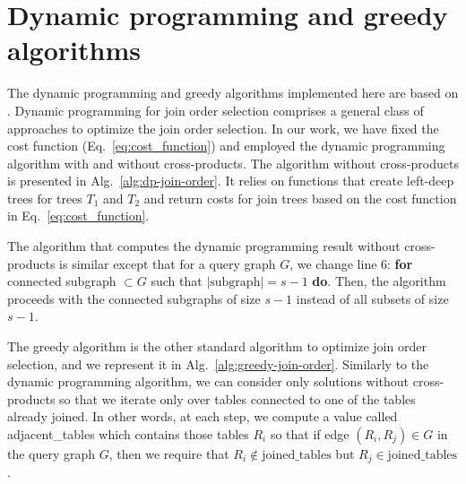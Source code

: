 \section{Dynamic programming and greedy algorithms}

The dynamic programming and greedy algorithms implemented here are based on \cite{Neumann_course}. Dynamic programming for join order selection comprises a general class of approaches to optimize the join order selection. In our work, we have fixed the cost function (Eq.~\eqref{eq:cost_function}) and employed the dynamic programming algorithm with and without cross-products. The algorithm without cross-products is presented in Alg.~\ref{alg:dp-join-order}. It relies on functions that create left-deep trees for trees $T_1$ and $T_2$ and return costs for join trees based on the cost function in Eq.~\eqref{eq:cost_function}.



The algorithm that computes the dynamic programming result without cross-products is similar except that for a query graph $G$, we change line 6: \textbf{for} connected subgraph $\subset G$ such that $|\text{subgraph}| = s - 1$ \textbf{do}. Then, the algorithm proceeds with the connected subgraphs of size $s - 1$ instead of all subsets of size $s - 1$.

The greedy algorithm is the other standard algorithm to optimize join order selection, and we represent it in Alg.~\ref{alg:greedy-join-order}. Similarly to the dynamic programming algorithm, we can consider only solutions without cross-products so that we iterate only over tables connected to one of the tables already joined. In other words, at each step, we compute a value called adjacent\_tables which contains those tables $R_i$ so that if edge $(R_i, R_j) \in G$ in the query graph $G$, then we require that $R_i \notin \text{joined\_tables}$ but $R_j \in \text{joined\_tables}$. 

